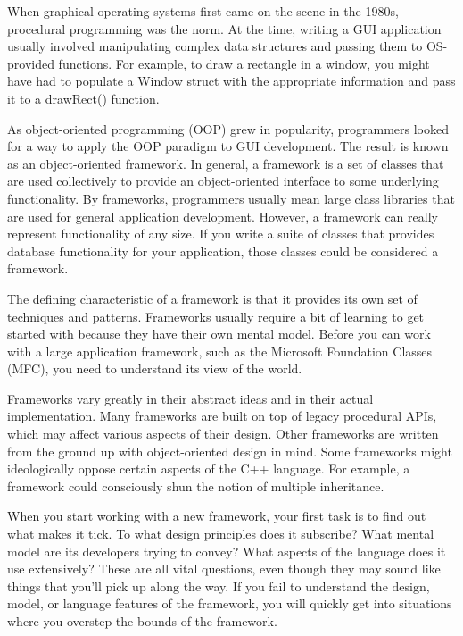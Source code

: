 
When graphical operating systems first came on the scene in the 1980s, procedural programming was the norm. At the time, writing a GUI application usually involved manipulating complex data structures and passing them to OS-provided functions. For example, to draw a rectangle in a window, you might have had to populate a Window struct with the appropriate information and pass it to a drawRect() function.

As object-oriented programming (OOP) grew in popularity, programmers looked for a way to apply the OOP paradigm to GUI development. The result is known as an object-oriented framework. In general, a framework is a set of classes that are used collectively to provide an object-oriented interface to some underlying functionality. By frameworks, programmers usually mean large class libraries that are used for general application development. However, a framework can really represent functionality of any size. If you write a suite of classes that provides database functionality for your application, those classes could be considered a framework.


The defining characteristic of a framework is that it provides its own set of techniques and patterns. Frameworks usually require a bit of learning to get started with because they have their own mental model. Before you can work with a large application framework, such as the Microsoft Foundation Classes (MFC), you need to understand its view of the world.

Frameworks vary greatly in their abstract ideas and in their actual implementation. Many frameworks are built on top of legacy procedural APIs, which may affect various aspects of their design. Other frameworks are written from the ground up with object-oriented design in mind. Some frameworks might ideologically oppose certain aspects of the C++ language. For example, a framework could consciously shun the notion of multiple inheritance.

When you start working with a new framework, your first task is to find out what makes it tick. To what design principles does it subscribe? What mental model are its developers trying to convey? What aspects of the language does it use extensively? These are all vital questions, even though they may sound like things that you’ll pick up along the way. If you fail to understand the design, model, or language features of the framework, you will quickly get into situations where you overstep the bounds of the framework.

